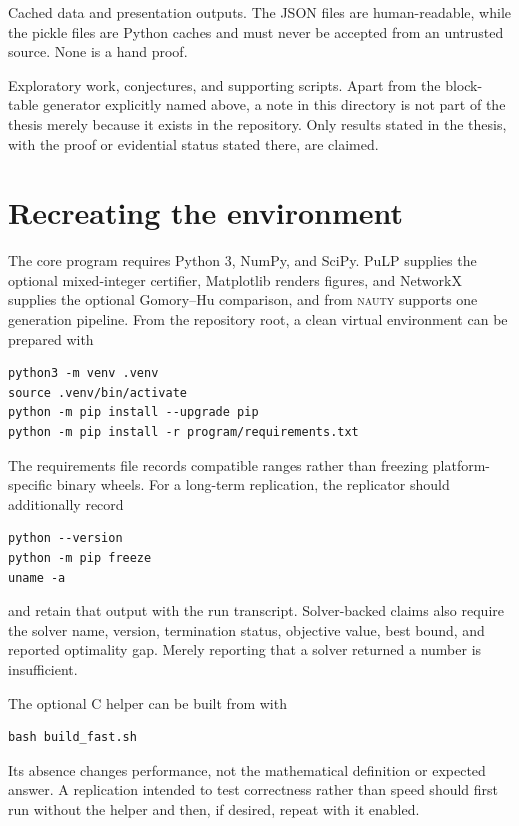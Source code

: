 \begin{description}[style=nextline]
  \item[\code{figures/*.json}, \code{figures/*.pkl}, and generated images]
  Cached data and presentation outputs. The JSON files are human-readable, while the pickle files are Python caches and must never be accepted from an untrusted source. None is a hand proof.

  \item[\code{research\_notes/}]
  Exploratory work, conjectures, and supporting scripts. Apart from the block-table generator explicitly named above, a note in this directory is not part of the thesis merely because it exists in the repository. Only results stated in the thesis, with the proof or evidential status stated there, are claimed.
\end{description}

\section{Recreating the environment}\label{app:software-environment}

The core program requires Python 3, NumPy, and SciPy. PuLP supplies the optional mixed-integer certifier, Matplotlib renders figures, and NetworkX supplies the optional Gomory--Hu comparison, and  from \textsc{nauty} supports one generation pipeline. From the repository root, a clean virtual environment can be prepared with

\begin{verbatim}
python3 -m venv .venv
source .venv/bin/activate
python -m pip install --upgrade pip
python -m pip install -r program/requirements.txt
\end{verbatim}

The requirements file records compatible ranges rather than freezing platform-specific binary wheels. For a long-term replication, the replicator should additionally record

\begin{verbatim}
python --version
python -m pip freeze
uname -a
\end{verbatim}

and retain that output with the run transcript. Solver-backed claims also require the solver name, version, termination status, objective value, best bound, and reported optimality gap. Merely reporting that a solver returned a number is insufficient.

The optional C helper can be built from  with

\begin{verbatim}
bash build_fast.sh
\end{verbatim}
Its absence changes performance, not the mathematical definition or expected answer. A replication intended to test correctness rather than speed should first run without the helper and then, if desired, repeat with it enabled.

